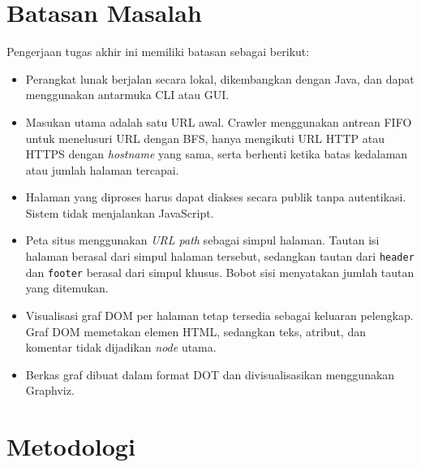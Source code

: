 \section{Batasan Masalah}
\label{sec:1:batasan}

Pengerjaan tugas akhir ini memiliki batasan sebagai berikut:
\begin{itemize}
    \item Perangkat lunak berjalan secara lokal, dikembangkan dengan Java, dan dapat menggunakan antarmuka CLI atau GUI.
    \item Masukan utama adalah satu URL awal. Crawler menggunakan antrean FIFO untuk menelusuri URL dengan BFS, hanya mengikuti URL HTTP atau HTTPS dengan \textit{hostname} yang sama, serta berhenti ketika batas kedalaman atau jumlah halaman tercapai.
    \item Halaman yang diproses harus dapat diakses secara publik tanpa autentikasi. Sistem tidak menjalankan JavaScript.
    \item Peta situs menggunakan \textit{URL path} sebagai simpul halaman. Tautan isi halaman berasal dari simpul halaman tersebut, sedangkan tautan dari \texttt{header} dan \texttt{footer} berasal dari simpul khusus. Bobot sisi menyatakan jumlah tautan yang ditemukan.
    \item Visualisasi graf DOM per halaman tetap tersedia sebagai keluaran pelengkap. Graf DOM memetakan elemen HTML, sedangkan teks, atribut, dan komentar tidak dijadikan \textit{node} utama.
    \item Berkas graf dibuat dalam format DOT dan divisualisasikan menggunakan Graphviz.
\end{itemize}

\section{Metodologi}
\label{sec:1:metlit}

